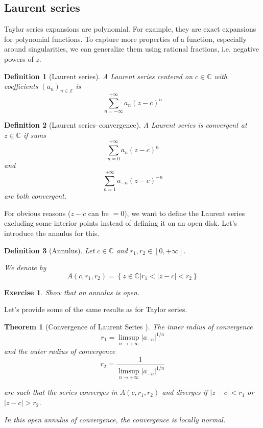 \documentclass{article}
\newtheorem*{defi}{Definition}
\newtheorem{exo}{Exercise}
\newtheorem*{thm*}{Theorem}
\begin{document}
\subsection{Laurent series}
Taylor series expansions are polynomial. For example, they are exact expansions for polynomial functions. To capture more properties of a function, especially around singularities, we can generalize them using rational fractions, i.e. negative powers of $z$.

\begin{defi}
    [Laurent series]
    A Laurent series centered on $c\in\mathbb{C}$ with coefficients $(a_n)_{n\in\mathbb{Z}}$ is 
    $$ \sum_{n=-\infty}^{+\infty}a_n(z-c)^n$$
\end{defi}

\begin{defi}
    [Laurent series--convergence]
    A Laurent series is convergent at $z\in\mathbb{C}$ if sums
    $$ \sum_{n=0}^{+\infty}a_n(z-c)^n$$
    and
    $$ \sum_{n=1}^{+\infty}a_{-n}(z-c)^{-n}$$
    are both convergent.
\end{defi}

For obvious reasons ($z-c$ can be $= 0$), we want to define the Laurent series excluding some interior points instead of defining it on an open disk. Let's introduce the annulus for this.

\begin{defi}
    [Annulus]
    Let $c\in\mathbb{C}$ and $r_1, r_2 \in [0, + \infty]$.

    We denote by 
    $$A(c, r_1, r_2) = \left\lbrace z\in\mathbb{C} \vert r_1 < | z-c | < r_2 \right \rbrace $$
\end{defi}
\begin{exo}
    Show that an annulus is open.
\end{exo}

Let's provide some of the same results as for Taylor series.

\begin{thm*}
    [Convergence of Laurent Series ]
    The inner radius of convergence 
    $$r_1  = \limsup_{n\rightarrow + \infty}|a_{-n}|^{1/n} $$
    and the outer radius of convergence
    $$r_2  = \frac{1}{\limsup_{n\rightarrow + \infty}|a_{-n}|^{1/n}} $$

    are such that the series converges in $A(c, r_1, r_2)$ and diverges if $|z-c| < r_1$ or $|z-c| > r_2$.

    In this open annulus of convergence, the convergence is locally normal.
\end{thm*}
\end{document}
